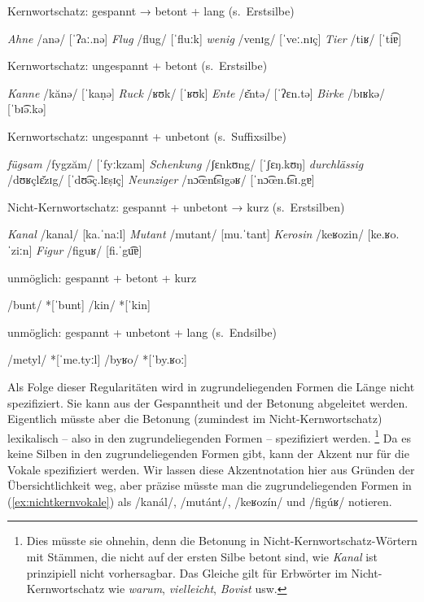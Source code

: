 \begin{exe}
  \ex Kernwortschatz: gespannt → betont + lang (s.\ Erstsilbe) \label{ex:gespannt}
  \begin{xlist}
    \ex \textit{Ahne} /anə/ [ˈʔaː.nə]
    \ex \textit{Flug} /flug/ [ˈfluːk]
    \ex \textit{wenig} /venɪg/ [ˈveː.nɪç]
    \ex \textit{Tier} /tiʁ/ [ˈti͡ɐ] \label{ex:gespanntsekdiphth}
  \end{xlist}
  \ex Kernwortschatz: ungespannt + betont (s.\ Erstsilbe)\label{ex:ungespanntbetont}
  \begin{xlist}
    \ex \textit{Kanne} /kănə/ [ˈkaṇə]
    \ex \textit{Ruck} /ʁʊk/ [ˈʁʊk]
    \ex \textit{Ente} /ɛ̆ntə/ [ˈʔɛn.tə]
    \ex \textit{Birke} /bɪʁkə/ [ˈbɪ͡ə.kə]
  \end{xlist}
  \ex Kernwortschatz: ungespannt + unbetont (s.\ Suffixsilbe) \label{ex:ungespanntunbetont}
  \begin{xlist}
    \ex \textit{fügsam} /fygzăm/ [ˈfyːkzam]
    \ex \textit{Schenkung} /ʃɛnkʊng/ [ˈʃɛŋ.kʊŋ]
    \ex \textit{durchlässig} /dʊʁçlɛ̆zɪg/ [ˈdʊ͡əç.lɛṣɪç]
    \ex \textit{Neunziger} /nɔ͡œnt͡sɪgəʁ/ [ˈnɔ͡œn.t͡sɪ.gɐ]
  \end{xlist}
  \ex Nicht-Kernwortschatz: gespannt + unbetont → kurz (s.\ Erstsilben) \label{ex:nichtkernvokale}
  \begin{xlist}
    \ex \textit{Kanal} /kanal/ [ka.ˈnaːl]
    \ex \textit{Mutant} /mutant/ [mu.ˈtant]
    \ex \textit{Kerosin} /keʁozin/ [ke.ʁo.ˈziːn]
    \ex \textit{Figur} /figuʁ/ [fi.ˈgu͡ɐ]
  \end{xlist}
  \ex unmöglich: gespannt + betont + kurz \label{ex:gespanntfalschkurz}
  \begin{xlist}
    \ex /bunt/ *[ˈbunt]
    \ex /kin/ *[ˈkin]
  \end{xlist}
  \ex unmöglich: gespannt + unbetont + lang (s.\ Endsilbe) \label{ex:gespanntfalschlang}
  \begin{xlist}
    \ex /metyl/ *[ˈme.tyːl]
    \ex /byʁo/ *[ˈby.ʁoː]
  \end{xlist}
\end{exe}

Als Folge dieser Regularitäten wird in zugrundeliegenden Formen die Länge nicht spezifiziert.
Sie kann aus der Gespanntheit und der Betonung abgeleitet werden.
Eigentlich müsste aber die Betonung (zumindest im Nicht-Kernwortschatz) lexikalisch -- also in den zugrundeliegenden Formen -- spezifiziert werden.%
\footnote{Dies müsste sie ohnehin, denn die Betonung in Nicht-Kernwortschatz-Wörtern mit Stämmen, die nicht auf der ersten Silbe betont sind, wie \textit{Kanal} ist prinzipiell nicht vorhersagbar.
Das Gleiche gilt für Erbwörter im Nicht-Kernwortschatz wie \textit{warum}, \textit{vielleicht}, \textit{Bovist} usw.}
Da es keine Silben in den zugrundeliegenden Formen gibt, kann der Akzent nur für die Vokale spezifiziert werden.
Wir lassen diese Akzentnotation hier aus Gründen der Übersichtlichkeit weg, aber präzise müsste man die zugrundeliegenden Formen in (\ref{ex:nichtkernvokale}) als /kanál/, /mutánt/, /keʁozín/ und /figúʁ/ notieren.

